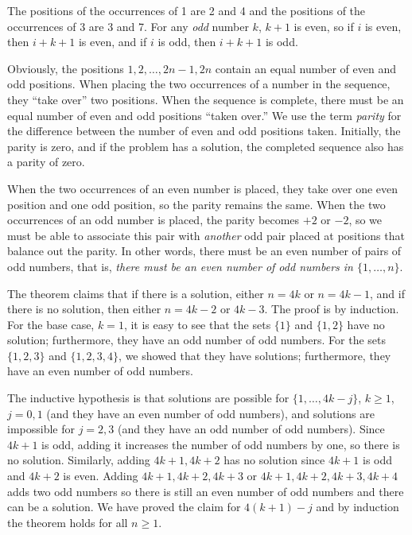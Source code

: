 \documentclass[11pt,a4paper]{report}
\begin{document}
The positions of the occurrences of 1 are 2 and 4 and the positions of the occurrences of 3 are 3 and 7. For any \emph{odd} number $k$, $k+1$ is even, so if $i$ is even, then $i+k+1$ is even, and if $i$ is odd, then $i+k+1$ is odd.

Obviously, the positions $1,2,\ldots,2n-1,2n$ contain an equal number of even and odd positions. When placing the two occurrences of a number in the sequence, they ``take over'' two positions. When the sequence is complete, there must be an equal number of even and odd positions ``taken over.'' We use the term \emph{parity} for the difference between the number of even and odd positions taken. Initially, the parity is zero, and if the problem has a solution, the completed sequence also has a parity of zero.

When the two occurrences of an even number is placed, they take over one even position and one odd position, so the parity remains the same. When the two occurrences of an odd number is placed, the parity becomes $+2$ or $-2$, so we must be able to associate this pair with \emph{another} odd pair placed at positions that balance out the parity. In other words, there must be an even number of pairs of odd numbers, that is, \emph{there must be an even number of odd numbers in $\{1,\ldots,n\}$}.

The theorem claims that if there is a solution, either $n=4k$ or $n=4k-1$, and if there is no solution, then either $n=4k-2$ or $4k-3$. The proof is by induction. For the base case, $k=1$, it is easy to see that the sets $\{1\}$ and $\{1,2\}$ have no solution; furthermore, they have an odd number of odd numbers. For the sets $\{1,2,3\}$ and $\{1,2,3,4\}$, we showed that they have solutions; furthermore, they have an even number of odd numbers.

The inductive hypothesis is that solutions are possible for $\{1,\ldots,4k-j\}$, $k\ge 1$, $j=0,1$ (and they have an even number of odd numbers), and solutions are impossible for $j=2,3$ (and they have an odd number of odd numbers). Since $4k+1$ is odd, adding it increases the number of odd numbers by one, so there is no solution. Similarly, adding $4k+1,4k+2$ has no solution since $4k+1$ is odd and $4k+2$ is even. Adding $4k+1,4k+2,4k+3$ or $4k+1,4k+2,4k+3,4k+4$ adds two odd numbers so there is still an even number of odd numbers and there can be a solution. We have proved the claim for $4(k+1)-j$ and by induction the theorem holds for all $n\ge 1$.

\newpage
\end{document}
